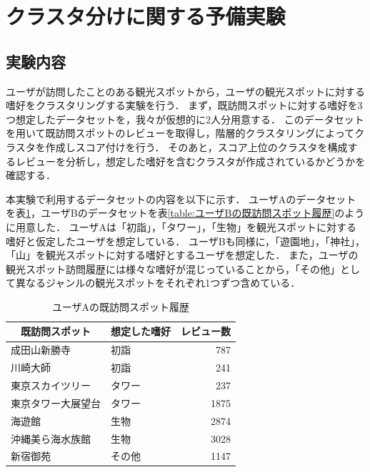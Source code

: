 \documentclass{deimj}
\begin{document}
\section{クラスタ分けに関する予備実験}
\subsection{実験内容}
ユーザが訪問したことのある観光スポットから，ユーザの観光スポットに対する嗜好をクラスタリングする実験を行う．
まず，既訪問スポットに対する嗜好を3つ想定したデータセットを，我々が仮想的に2人分用意する．
このデータセットを用いて既訪問スポットのレビューを取得し，階層的クラスタリングによってクラスタを作成しスコア付けを行う．
そのあと，スコア上位のクラスタを構成するレビューを分析し，想定した嗜好を含むクラスタが作成されているかどうかを確認する．

本実験で利用するデータセットの内容を以下に示す．
ユーザAのデータセットを表\ref{table:ユーザAの既訪問スポット履歴}，ユーザBのデータセットを表\ref{table:ユーザBの既訪問スポット履歴}のように用意した．
ユーザAは「初詣」，「タワー」，「生物」を観光スポットに対する嗜好と仮定したユーザを想定している．
ユーザBも同様に，「遊園地」，「神社」，「山」を観光スポットに対する嗜好とするユーザを想定した．
また，ユーザの観光スポット訪問履歴には様々な嗜好が混じっていることから，「その他」として異なるジャンルの観光スポットをそれぞれ1つずつ含めている．

\begin{table}[t]
    \caption{ユーザAの既訪問スポット履歴}
    \label{table:ユーザAの既訪問スポット履歴}
    \centering
    \begin{tabular}{l|l|r}
    \hline
    \multicolumn{1}{c|}{既訪問スポット} & \multicolumn{1}{c|}{想定した嗜好} & \multicolumn{1}{c}{レビュー数} \\ \hline
    成田山新勝寺                       & 初詣                          & 787                       \\
    川崎大師                         & 初詣                          & 241                       \\
    東京スカイツリー                     & タワー                         & 237                       \\
    東京タワー大展望台                    & タワー                         & 1875                      \\
    海遊館                          & 生物                          & 2874                      \\
    沖縄美ら海水族館                     & 生物                          & 3028                      \\
    新宿御苑                         & その他                         & 1147                      \\ \hline
    \end{tabular}
\end{table}
\end{document}
